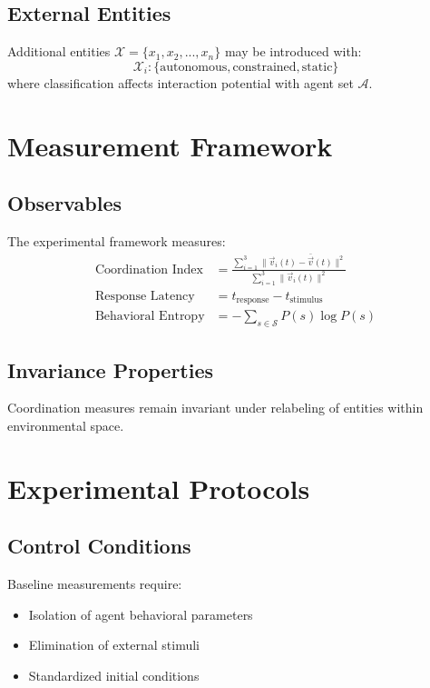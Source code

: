 \documentclass{article}
\begin{document}
\subsection{External Entities}
Additional entities $\mathcal{X} = \{x_1, x_2, ..., x_n\}$ may be introduced with:
$$\mathcal{X}_i: \{\text{autonomous}, \text{constrained}, \text{static}\}$$
where classification affects interaction potential with agent set $\mathcal{A}$.

\section{Measurement Framework}

\subsection{Observables}
The experimental framework measures:
\begin{align}
\text{Coordination Index} &= \frac{\sum_{i=1}^{3} \|\vec{v}_i(t) - \bar{\vec{v}}(t)\|^2}{\sum_{i=1}^{3} \|\vec{v}_i(t)\|^2} \\
\text{Response Latency} &= t_{\text{response}} - t_{\text{stimulus}} \\
\text{Behavioral Entropy} &= -\sum_{s \in \mathcal{S}} P(s) \log P(s)
\end{align}

\subsection{Invariance Properties}
\begin{theorem}
Coordination measures remain invariant under relabeling of entities within environmental space.
\end{theorem}

\section{Experimental Protocols}

\subsection{Control Conditions}
Baseline measurements require:
\begin{itemize}
    \item Isolation of agent behavioral parameters
    \item Elimination of external stimuli
    \item Standardized initial conditions
\end{itemize}
\end{document}
